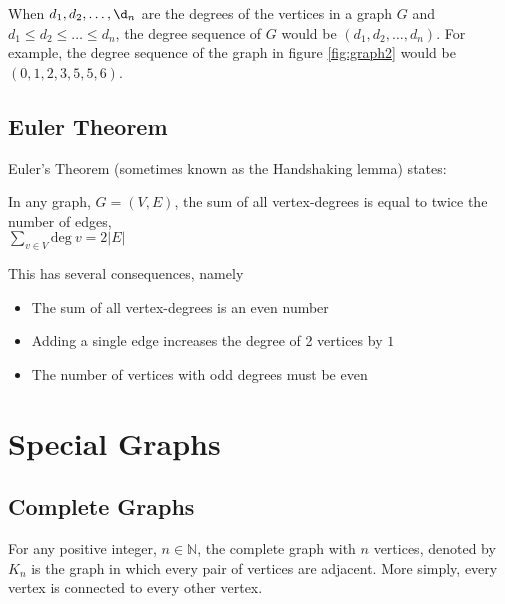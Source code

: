 When $d_1, d_2, \dots, \d_n$ are the degrees of the vertices in a graph $G$ and $d_1 \leq d_2 \leq \ldots \leq d_n$, the
 degree sequence of $G$ would be $(d_1, d_2, \dots, d_n)$. For example, the degree sequence of the graph in figure
 \ref*{fig:graph2} would be $(0, 1, 2, 3, 5, 5, 6)$.

\subsection*{Euler Theorem}

Euler's Theorem (sometimes known as the Handshaking lemma) states:
\begin{center}
  In any graph, $G = (V, E)$, the sum of all vertex-degrees is equal to twice the number of edges,\\
  $\sum_{v \in V} \mathrm{deg\ } v = 2 \lvert E \rvert$
\end{center}

This has several consequences, namely
\begin{itemize}
  \item The sum of all vertex-degrees is an even number
  \item Adding a single edge increases the degree of 2 vertices by $1$
  \item The number of vertices with odd degrees must be even
\end{itemize}

\section*{Special Graphs}

\subsection*{Complete Graphs}

For any positive integer, $n \in \mathbb{N}$, the complete graph with $n$ vertices, denoted by $K_n$ is the graph in
 which every pair of vertices are adjacent. More simply, every vertex is connected to every other vertex.

